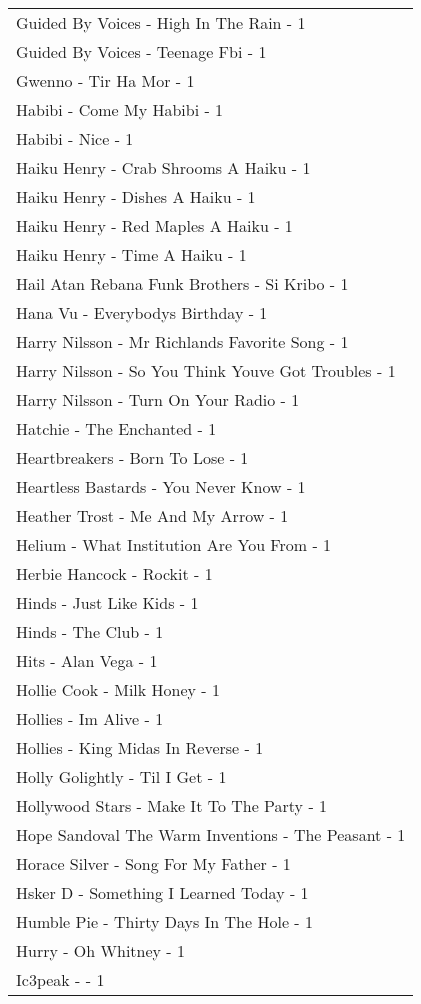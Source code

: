 \documentclass[
]{article}
\begin{document}
\begin{longtable}{l}
Guided By Voices - High In The Rain - 1 \\ 
Guided By Voices - Teenage Fbi - 1 \\ 
Gwenno - Tir Ha Mor - 1 \\ 
Habibi - Come My Habibi - 1 \\ 
Habibi - Nice - 1 \\ 
Haiku Henry - Crab Shrooms A Haiku - 1 \\ 
Haiku Henry - Dishes A Haiku - 1 \\ 
Haiku Henry - Red Maples A Haiku - 1 \\ 
Haiku Henry - Time A Haiku - 1 \\ 
Hail Atan Rebana Funk Brothers - Si Kribo - 1 \\ 
Hana Vu - Everybodys Birthday - 1 \\ 
Harry Nilsson - Mr Richlands Favorite Song - 1 \\ 
Harry Nilsson - So You Think Youve Got Troubles - 1 \\ 
Harry Nilsson - Turn On Your Radio - 1 \\ 
Hatchie - The Enchanted - 1 \\ 
Heartbreakers - Born To Lose - 1 \\ 
Heartless Bastards - You Never Know - 1 \\ 
Heather Trost - Me And My Arrow - 1 \\ 
Helium - What Institution Are You From - 1 \\ 
Herbie Hancock - Rockit - 1 \\ 
Hinds - Just Like Kids - 1 \\ 
Hinds - The Club - 1 \\ 
Hits - Alan Vega - 1 \\ 
Hollie Cook - Milk Honey - 1 \\ 
Hollies - Im Alive - 1 \\ 
Hollies - King Midas In Reverse - 1 \\ 
Holly Golightly - Til I Get - 1 \\ 
Hollywood Stars - Make It To The Party - 1 \\ 
Hope Sandoval The Warm Inventions - The Peasant - 1 \\ 
Horace Silver - Song For My Father - 1 \\ 
Hsker D - Something I Learned Today - 1 \\ 
Humble Pie - Thirty Days In The Hole - 1 \\ 
Hurry - Oh Whitney - 1 \\ 
Ic3peak -  - 1 \\ 

\end{longtable}
\end{document}
